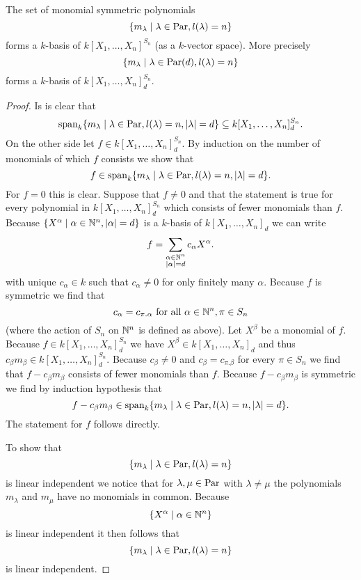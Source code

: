 \begin{lem}
  The set of monomial symmetric polynomials
  \[
    \{
      m_\lambda
    \mid
      \lambda \in \operatorname{Par},
      l(\lambda) = n
    \}
  \]
  forms a $k$-basis of $k[X_1, \dotsc, X_n]^{S_n}$ (as a $k$-vector space). More precisely
  \[
    \{
      m_\lambda
    \mid
      \lambda \in \operatorname{Par}(d),
      l(\lambda) = n
    \}
  \]
  forms a $k$-basis of $k[X_1, \dotsc, X_n]^{S_n}_d$.
\end{lem}
\begin{proof}
  Is is clear that
  \[
            \operatorname{span}_k \{
                        m_\lambda
                      \mid
                        \lambda \in \operatorname{Par},
                        l(\lambda) = n,
                        |\lambda| = d
                      \}
  \subseteq k[X_1, \dotsc, X_n]^{S_n}_d.
  \]
  On the other side let $f \in k[X_1, \dotsc, X_n]^{S_n}_d$. By induction on the number of monomials of which $f$ consists we show that
  \[
        f
    \in \operatorname{span}_k  \{
                    m_\lambda
                  \mid
                    \lambda \in \operatorname{Par},
                    l(\lambda) = n,
                    |\lambda| = d
                  \}.
  \]
  For $f = 0$ this is clear.
  Suppose that $f \neq 0$ and that the statement is true for every polynomial in $k[X_1, \dotsc, X_n]^{S_n}_d$ which consists of fewer monomials than $f$.
  Because $\{X^\alpha \mid \alpha \in \mathbb{N}^n, |\alpha| = d \}$ is a $k$-basis of $k[X_1, \dotsc, X_n]_d$ we can write
  \[
      f
    = \sum_{\substack{\alpha \in \mathbb{N}^n \\ |\alpha| = d}} c_\alpha X^\alpha.
  \]
  with unique $c_\alpha \in k$ such that $c_\alpha \neq 0$ for only finitely many $\alpha$.
  Because $f$ is symmetric we find that
  \[
      c_\alpha
    = c_{\pi.\alpha}
    \text{ for all }
    \alpha \in \mathbb{N}^n,
    \pi \in S_n
  \]
  (where the action of $S_n$ on $\mathbb{N}^n$ is defined as above).
  Let $X^\beta$ be a monomial of $f$.
  Because $f \in k[X_1, \dotsc, X_n]^{S_n}_d$ we have $X^\beta \in k[X_1, \dotsc, X_n]_d$ and thus $c_\beta m_\beta \in k[X_1, \dotsc, X_n]^{S_n}_d$.
  Because $c_\beta \neq 0$ and $c_\beta = c_{\pi.\beta}$ for every $\pi \in S_n$ we find that $f - c_{\beta} m_\beta$ consists of fewer monomials than $f$.
  Because $f-c_{\beta} m_\beta$ is symmetric we find by induction hypothesis that
  \[
        f - c_{\beta} m_\beta
    \in \operatorname{span}_k  \{
                    m_\lambda
                  \mid
                    \lambda \in \operatorname{Par},
                    l(\lambda) = n,
                    |\lambda| = d
                  \}.
  \]
  The statement for $f$ follows directly.
  
  To show that
  \[
    \{
      m_\lambda
    \mid
      \lambda \in \operatorname{Par},
      l(\lambda) = n
    \}
  \]
  is linear independent we notice that for $\lambda, \mu \in \operatorname{Par}$ with $\lambda \neq \mu$ the polynomials $m_\lambda$ and $m_\mu$ have no monomials in common. Because
  \[
    \{
      X^\alpha
    \mid
      \alpha \in \mathbb{N}^n
    \}
  \]
  is linear independent it then follows that
  \[
    \{
      m_\lambda
    \mid
      \lambda \in \operatorname{Par},
      l(\lambda) = n
    \}
  \]
  is linear independent.
\end{proof}


